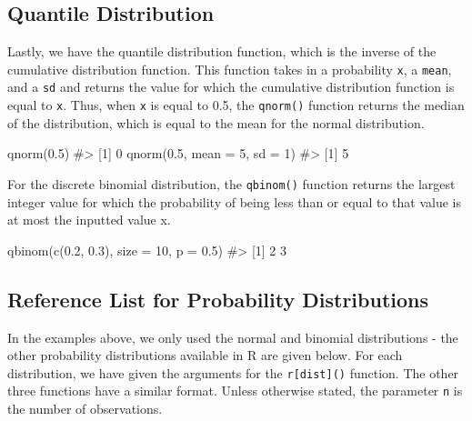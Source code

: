 \documentclass[
  letterpaper,
]{krantz}
\makeatletter
\newenvironment{Shaded}{\begin{snugshade}}{\end{snugshade}}
\newcommand{\AttributeTok}[1]{\textcolor[rgb]{0.40,0.45,0.13}{#1}}
\newcommand{\CommentTok}[1]{\textcolor[rgb]{0.37,0.37,0.37}{#1}}
\newcommand{\DecValTok}[1]{\textcolor[rgb]{0.68,0.00,0.00}{#1}}
\newcommand{\FloatTok}[1]{\textcolor[rgb]{0.68,0.00,0.00}{#1}}
\newcommand{\FunctionTok}[1]{\textcolor[rgb]{0.28,0.35,0.67}{#1}}
\newcommand{\NormalTok}[1]{\textcolor[rgb]{0.00,0.23,0.31}{#1}}
\newenvironment{kframe}{%
\medskip{}
\setlength{\fboxsep}{.8em}
 \def\at@end@of@kframe{}%
 \ifinner\ifhmode%
  \def\at@end@of@kframe{\end{minipage}}%
  \begin{minipage}{\columnwidth}%
 \fi\fi%
 \def\FrameCommand##1{\hskip\@totalleftmargin \hskip-\fboxsep
 \colorbox{shadecolor}{##1}\hskip-\fboxsep
     \hskip-\linewidth \hskip-\@totalleftmargin \hskip\columnwidth}%
 \MakeFramed {\advance\hsize-\width
   \@totalleftmargin\z@ \linewidth\hsize
   \@setminipage}}%
 {\par\unskip\endMakeFramed%
 \at@end@of@kframe}
\renewenvironment{Shaded}{\begin{kframe}}{\end{kframe}}
\makeatother
\begin{document}
\hypertarget{quantile-distribution}{%
\subsection{Quantile Distribution}\label{quantile-distribution}}

Lastly, we have the quantile distribution function, which is the inverse
of the cumulative distribution function. This function takes in a
probability \texttt{x}, a \texttt{mean}, and a \texttt{sd} and returns
the value for which the cumulative distribution function is equal to
\texttt{x}. Thus, when \texttt{x} is equal to 0.5, the \texttt{qnorm()}
function returns the median of the distribution, which is equal to the
mean for the normal distribution.

\begin{Shaded}
\begin{Highlighting}[]
\FunctionTok{qnorm}\NormalTok{(}\FloatTok{0.5}\NormalTok{)}
\CommentTok{\#\textgreater{} [1] 0}
\FunctionTok{qnorm}\NormalTok{(}\FloatTok{0.5}\NormalTok{, }\AttributeTok{mean =} \DecValTok{5}\NormalTok{, }\AttributeTok{sd =} \DecValTok{1}\NormalTok{)}
\CommentTok{\#\textgreater{} [1] 5}
\end{Highlighting}
\end{Shaded}

For the discrete binomial distribution, the \texttt{qbinom()} function
returns the largest integer value for which the probability of being
less than or equal to that value is at most the inputted value x.

\begin{Shaded}
\begin{Highlighting}[]
\FunctionTok{qbinom}\NormalTok{(}\FunctionTok{c}\NormalTok{(}\FloatTok{0.2}\NormalTok{, }\FloatTok{0.3}\NormalTok{), }\AttributeTok{size =} \DecValTok{10}\NormalTok{, }\AttributeTok{p =} \FloatTok{0.5}\NormalTok{)}
\CommentTok{\#\textgreater{} [1] 2 3}
\end{Highlighting}
\end{Shaded}

\hypertarget{reference-list-for-probability-distributions}{%
\subsection{Reference List for Probability
Distributions}\label{reference-list-for-probability-distributions}}

In the examples above, we only used the normal and binomial
distributions - the other probability distributions available in R are
given below. For each distribution, we have given the arguments for the
\texttt{r{[}dist{]}()} function. The other three functions have a
similar format. Unless otherwise stated, the parameter \texttt{n} is the
number of observations.
\end{document}
